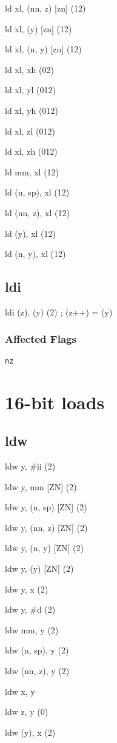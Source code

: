 \documentclass{book}
\begin{document}
ld xl, (nn, z) [zn] (12)

ld xl, (y) [zn] (12)

ld xl, (n, y) [zn] (12)

ld xl, xh (02)

ld xl, yl (012)

ld xl, yh (012)

ld xl, zl (012)

ld xl, zh (012)

ld mm, xl (12)

ld (n, sp), xl (12)

ld (nn, z), xl (12)

ld (y), xl (12)

ld (n, y), xl (12)


\subsection{ldi}

ldi (z), (y) (2)   ; (z++) = (y)

\subsubsection*{Affected Flags}

\texttt{nz}


\section{16-bit loads}

\subsection{ldw}

ldw y, \#ii (2)

ldw y, mm [ZN] (2)

ldw y, (n, sp) [ZN] (2)

ldw y, (nn, z) [ZN] (2)

ldw y, (n, y) [ZN] (2)

ldw y, (y) [ZN] (2) 

ldw y, x (2)

ldw y, \#d (2)

ldw mm, y (2)

ldw (n, sp), y (2)

ldw (nn, z), y (2)

ldw x, y

ldw z, y (0)

ldw (y), x (2)
\end{document}
